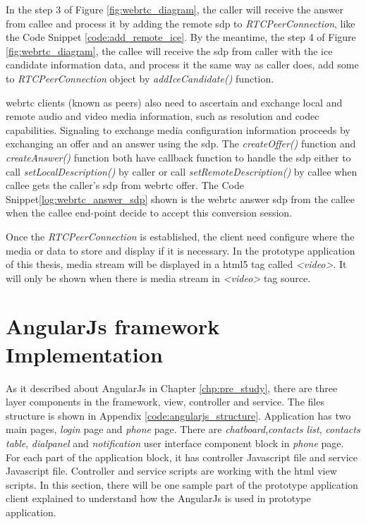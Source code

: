 \par In the step 3 of Figure \ref{fig:webrtc_diagram}, the caller will receive the answer from callee and process it by adding the remote \gls{sdp} to \textit{RTCPeerConnection}, like the Code Snippet \ref{code:add_remote_ice}. By the meantime, the step 4 of Figure \ref{fig:webrtc_diagram}, the callee will receive the \gls{sdp} from caller with the \gls{ice} candidate information data, and process it the same way as caller does, add some to \textit{RTCPeerConnection} object by \textit{addIceCandidate()} function.

\par \gls{webrtc} clients (known as peers) also need to ascertain and exchange local and remote audio and video media information, such as resolution and codec capabilities. Signaling to exchange media configuration information proceeds by exchanging an offer and an answer using the \gls{sdp}. The \textit{createOffer()} function and \textit{createAnswer()} function both have callback function to handle the \gls{sdp} either to call \textit{setLocalDescription()} by caller or call \textit{setRemoteDescription()} by callee when callee gets the caller's \gls{sdp} from \gls{webrtc} offer. The Code Snippet\ref{log:webrtc_answer_sdp} shown is the \gls{webrtc} answer \gls{sdp} from the callee when the callee end-point decide to accept this conversion session.

\par Once the \textit{RTCPeerConnection} is established, the client need configure where the media or data to store and display if it is necessary. In the prototype application of this thesis, media stream will be displayed in a \gls{html5} tag called \textit{<video>}. It will only be shown when there is media stream in \textit{<video>} tag source.

\section{AngularJs framework Implementation}

\noindent As it described about AngularJs in Chapter \ref{chp:pre_study}, there are three layer components in the framework, view, controller and service. The files structure is shown in Appendix \ref{code:angularjs_structure}. Application has two main pages, \textit{login} page and \textit{phone} page. There are \textit{chatboard},\textit{contacts list}, \textit{contacts table}, \textit{dialpanel} and \textit{notification} user interface component block in \textit{phone} page. For each part of the application block, it has controller Javascript file and service Javascript file. Controller and service scripts are working with the \gls{html} view scripts. In this section, there will be one sample part of the prototype application client explained to understand how the AngularJs is used in prototype application.

